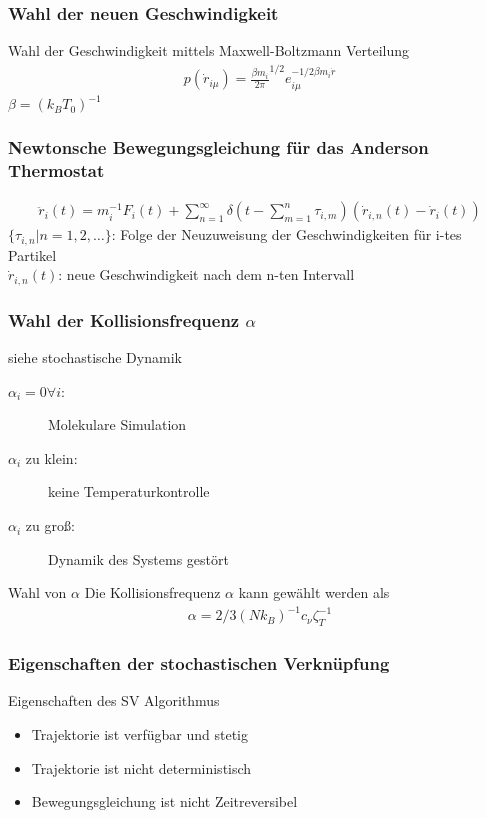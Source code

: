 \documentclass{beamer}
\begin{document}
\begin{frame} 
	\frametitle{Wahl der neuen Geschwindigkeit}
	 Wahl der Geschwindigkeit mittels Maxwell-Boltzmann Verteilung
	\begin{align*}
		p(\dot{r}_{i \mu}) = {\frac{\beta m_i}{2 \pi}}^{1/2} e^{-1/2 \beta m_i \dot{r}}_{i \mu}
	\end{align*}
	$\beta = (k_B T_0)^{-1}$
\end{frame}


\begin{frame} 
	\frametitle{Newtonsche Bewegungsgleichung für das Anderson Thermostat}
	\begin{align*}
	\ddot{r}_i(t) = m_i^{-1} F_i(t) + \sum\limits_{n=1}^{\infty} \delta \left(  t - \sum\limits_{m=1}^n \tau_{i,m}\right) \left( \dot{r}_{i,n}(t) - \dot{r}_i(t) \right)
	\end{align*}
	 $\{\tau_{i,n}| n=1,2, \dots\}$:  Folge der Neuzuweisung der Geschwindigkeiten für i-tes Partikel \\
	 $\dot{r}_{i,n}(t)$: neue Geschwindigkeit nach dem n-ten Intervall
\end{frame}


\begin{frame} 
	\frametitle{Wahl der Kollisionsfrequenz $\alpha$}
	siehe stochastische Dynamik
	\begin{description}
		\item[$\alpha_i=0 \forall i$:] Molekulare Simulation
		\item[$\alpha_i$ zu klein:] keine Temperaturkontrolle
		\item[$\alpha_i$ zu groß:] Dynamik des Systems gestört 
	\end{description}
	\begin{block}{Wahl von $\alpha$}
		Die Kollisionsfrequenz $\alpha$ kann gewählt werden als
		\begin{align*}
			\alpha = 2/3 (N k_B)^{-1} c_{\nu} \zeta_T^{-1}
		\end{align*}
	\end{block}	
\end{frame}


\begin{frame} 
	\frametitle{Eigenschaften der stochastischen Verknüpfung} 
	\begin{block}{Eigenschaften des SV Algorithmus}
		\begin{itemize}
			\item Trajektorie ist verfügbar und stetig
			\item  Trajektorie ist nicht deterministisch
			\item Bewegungsgleichung ist nicht Zeitreversibel
		\end{itemize}
	\end{block}
\end{frame}
\end{document}
